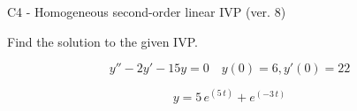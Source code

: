 \begin{exercise}
  \begin{exerciseTitle}C4 - Homogeneous second-order linear IVP (ver. 8)\end{exerciseTitle}
  \begin{exerciseStatement}
    
Find the solution to the given IVP.

    
\[y''-2y'-15y = 0 \hspace{1em} y(0) = 6 , y'(0) = 22\]

  \end{exerciseStatement}
  \begin{exerciseAnswer}
    
\[y= 5 \, e^{\left(5 \, t\right)} + e^{\left(-3 \, t\right)}\]

  \end{exerciseAnswer}
\end{exercise}